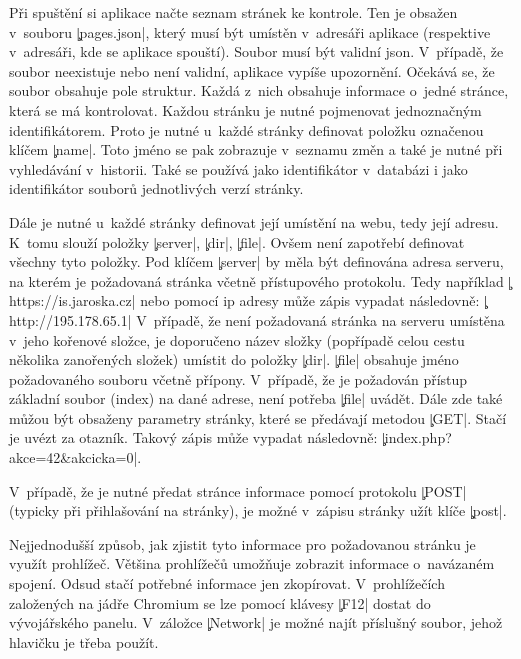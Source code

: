 
Při spuštění si aplikace načte seznam stránek ke kontrole.
Ten je obsažen v~souboru \c|pages.json|, který musí být umístěn v~adresáři aplikace (respektive v~adresáři, kde se aplikace spouští).
Soubor musí být validní json.
V~případě, že soubor neexistuje nebo není validní, aplikace vypíše upozornění. %
Očekává se, že soubor obsahuje pole struktur.
Každá z~nich obsahuje informace o~jedné stránce, která se má kontrolovat.
Každou stránku je nutné pojmenovat jednoznačným identifikátorem.
Proto je nutné u~každé stránky definovat položku označenou klíčem \c|name|.
Toto jméno se pak zobrazuje v~seznamu změn a také je nutné při vyhledávání v~historii.
Také se používá jako identifikátor v~databázi i jako identifikátor souborů jednotlivých verzí stránky.

Dále je nutné u~každé stránky definovat její umístění na webu, tedy její adresu.
K~tomu slouží položky \c|server|, \c|dir|, \c|file|.
Ovšem není zapotřebí definovat všechny tyto položky.
Pod klíčem \c|server| by měla být definována adresa serveru, na kterém je požadovaná stránka včetně přístupového protokolu.
Tedy například \c|https://is.jaroska.cz| nebo pomocí ip adresy může zápis vypadat následovně: \c|http://195.178.65.1|
V~případě, že není požadovaná stránka na serveru umístěna v~jeho kořenové složce, je doporučeno název složky (popřípadě celou cestu několika zanořených složek) umístit do položky \c|dir|.
\c|file| obsahuje jméno požadovaného souboru včetně přípony.
V~případě, že je požadován přístup základní soubor (index) na dané adrese, není potřeba \c|file| uvádět.
Dále zde také můžou být obsaženy parametry stránky, které se předávají metodou \c|GET|.
Stačí je uvézt za otazník.
Takový zápis může vypadat následovně: \c|index.php?akce=42&akcicka=0|.

V~případě, že je nutné předat stránce informace pomocí protokolu \c|POST| (typicky při přihlašování na stránky), 
je možné v~zápisu stránky užít klíče \c|post|.

Nejjednodušší způsob, jak zjistit tyto informace pro požadovanou stránku je využít prohlížeč.
Většina prohlížečů umožňuje zobrazit informace o~navázaném spojení.
Odsud stačí potřebné informace jen zkopírovat.
V~prohlížečích založených na jádře Chromium se lze pomocí klávesy \c|F12| dostat do vývojářského panelu.
V~záložce \c|Network| je možné najít příslušný soubor, jehož hlavičku je třeba použít.

